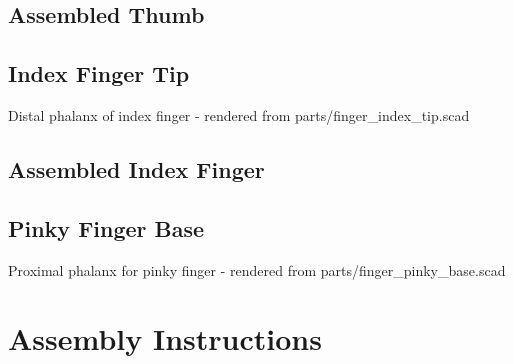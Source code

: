 \documentclass[11pt]{article}
\begin{document}
\hypertarget{thing_thumb\_assembly}{\subsection{Assembled Thumb}}

\hypertarget{thing_index\_tip}{\subsection{Index Finger Tip}}
Distal phalanx of index finger - rendered from parts/finger_index_tip.scad

\hypertarget{thing_index\_finger\_assembly}{\subsection{Assembled Index Finger}}

\hypertarget{thing_pinky\_base}{\subsection{Pinky Finger Base}}
Proximal phalanx for pinky finger - rendered from parts/finger_pinky_base.scad

\newpage

\section{Assembly Instructions}
\end{document}
